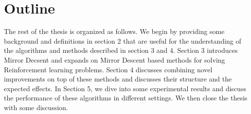 \section{Outline}

The rest of the thesis is organized as follows. We begin by providing some background and definitions in section 2
that are useful for the understanding of the algorithms and methods described in section 3 and 4. Section 3 introduces Mirror Decsent
and expands on Mirror Descent based methods for solving Reinforcement learning problems. Section 4 discusses combining novel improvements
on top of these methods and discusses their structure and the expected effects. In Section 5, we dive into some experimental results and
discuss the performance of these algorithms in different settings. We then close the thesis with some discussion.